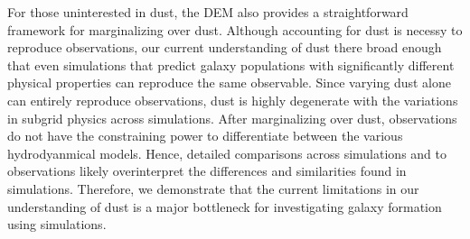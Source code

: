 For those uninterested in dust, the DEM also provides a straightforward framework 
for marginalizing over dust. Although accounting for dust is necessy to reproduce 
observations, our current understanding of dust there broad enough that even 
simulations that predict galaxy populations with significantly different physical properties can
reproduce the same observable. Since varying dust alone can entirely reproduce 
observations, dust is highly degenerate with the variations in subgrid physics 
across simulations. After marginalizing over dust, observations do not have the
constraining power to differentiate between the various hydrodyanmical models.
Hence, detailed comparisons across simulations and to observations likely 
overinterpret the differences and similarities found in simulations. Therefore, 
we demonstrate that the current limitations in our understanding of dust is a 
major bottleneck for investigating galaxy formation using simulations.
